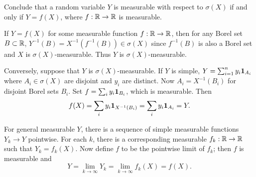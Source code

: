 \documentclass[a4paper, 12pt]{article}
\begin{document}
\begin{exercise}{1.6}
    Conclude that a random variable $Y$ is measurable with respect to $\sigma(X)$ 
    if and only if $Y = f(X)$, where $f:\mathbb{R}\to\mathbb{R}$ is measurable.
\end{exercise}
\begin{solution}
    If $Y = f(X)$ for some measurable function $f:\mathbb{R}\to\mathbb{R}$, then for any Borel set 
    $B\subset\mathbb{R}$, $Y^{-1}(B) = X^{-1}(f^{-1}(B))\in\sigma(X)$ since $f^{-1}(B)$ is 
    also a Borel set and $X$ is $\sigma(X)$-measurable. Thus $Y$ is $\sigma(X)$-measurable. 

    Conversely, suppose that $Y$ is $\sigma(X)$-measurable. If $Y$ is simple, 
    $Y = \sum_{i=1}^n y_i\mathbf{1}_{A_i}$ where $A_i\in\sigma(X)$ are disjoint and 
    $y_i$ are distinct. Now $A_i = X^{-1}(B_i)$ for disjoint Borel sets $B_i$. 
    Set $f = \sum_i y_i\mathbf{1}_{B_i}$, which is measurable. Then 
    \begin{equation*}
        f(X) = \sum_i y_i\mathbf{1}_{X^{-1}(B_i)} = \sum_i y_i\mathbf{1}_{A_i} = Y.
    \end{equation*}

    For general measurable $Y$, there is a sequence of simple measurable functions 
    $Y_k\to Y$ pointwise. For each $k$, there is a corresponding measurable $f_k:\mathbb{R}\to\mathbb{R}$ 
    such that $Y_k = f_k(X)$. Now define $f$ to be the pointwise limit of $f_k$; 
    then $f$ is measurable and
    \begin{equation*}
        Y = \lim_{k\to\infty} Y_k = \lim_{k\to\infty} f_k(X) = f(X).
    \end{equation*}
\end{solution}
\end{document}
